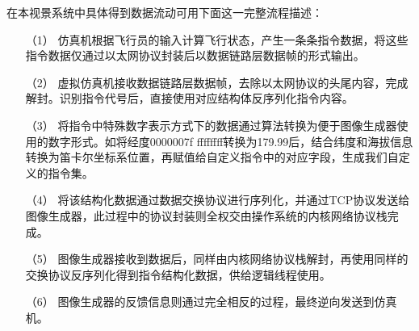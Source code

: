 在本视景系统中具体得到数据流动可用下面这一完整流程描述：
\begin{itemize}
    \item [（1）]
    仿真机根据飞行员的输入计算飞行状态，产生一条条指令数据，将这些指令数据仅通过以太网协议封装后以数据链路层数据帧的形式输出。
    \item [（2）]
    虚拟仿真机接收数据链路层数据帧，去除以太网协议的头尾内容，完成解封。识别指令代号后，直接使用对应结构体反序列化指令内容。
    \item [（3）]
    将指令中特殊数字表示方式下的数据通过算法转换为便于图像生成器使用的数字形式。如将经度0000007f ffffffff转换为179.99后，结合纬度和海拔信息转换为笛卡尔坐标系位置，再赋值给自定义指令中的对应字段，生成我们自定义的指令集。
    \item [（4）]
    将该结构化数据通过数据交换协议进行序列化，并通过TCP协议发送给图像生成器，此过程中的协议封装则全权交由操作系统的内核网络协议栈完成。
    \item [（5）]
    图像生成器接收到数据后，同样由内核网络协议栈解封，再使用同样的交换协议反序列化得到指令结构化数据，供给逻辑线程使用。
    \item [（6）]
    图像生成器的反馈信息则通过完全相反的过程，最终逆向发送到仿真机。
\end{itemize}



